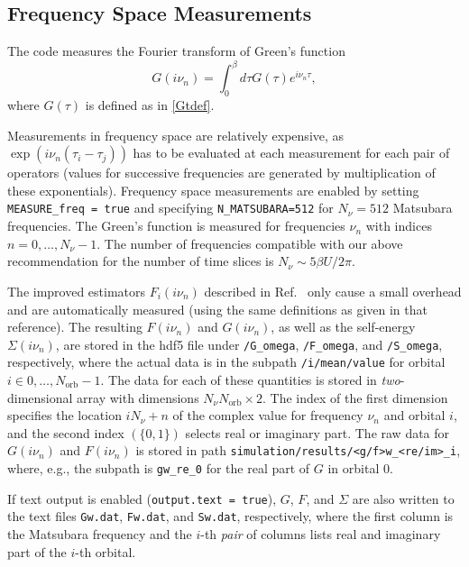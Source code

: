 \documentclass[aps,prb,floatfix,superscriptaddress,twocolumn,notitlepage]{revtex4-1}
\newcommand{\iom}{{\ensuremath{i\nu}}}
\begin{document}
\subsection{Frequency Space Measurements}

The code measures the Fourier transform of Green's function 
\begin{equation}
G(\iom_{n}) = \int_{0}^{\beta} d\tau G(\tau) e^{\iom_{n}\tau},
\end{equation}
where $G(\tau)$ is defined as in \eqref{Gtdef}.

Measurements in frequency space are relatively expensive, as $\exp(\iom_{n} (\tau_i-\tau_j))$ has to be evaluated at each measurement for each pair of operators (values for successive frequencies are generated by multiplication of these exponentials). Frequency space measurements are enabled by setting \verb#MEASURE_freq = true# and specifying \verb#N_MATSUBARA=512# for $N_{\nu}=512$ Matsubara frequencies. The Green's function is measured for frequencies $\nu_{n}$ with indices $n=0,\ldots,N_{\nu}-1$. The number of frequencies compatible with our above recommendation for the number of time slices is $N_{\nu}\sim 5\beta U/2\pi$.

The improved estimators $F_{i}(\iom_n)$ described in Ref.~ only cause a small overhead and are automatically measured (using the same definitions as given in that reference). The resulting $F(\iom_n)$ and $G(\iom_n)$, as well as the self-energy $\Sigma(\iom_n)$, are stored in the hdf5 file under \verb#/G_omega#, \verb#/F_omega#, and \verb#/S_omega#, respectively, where the actual data is in the subpath \verb#/i/mean/value# for orbital $i \in 0,\ldots,N_{\text{orb}}-1$. The data for each of these quantities is stored in \emph{two}-dimensional array with dimensions $N_{\nu}N_{\text{orb}}\times 2$. The index of the first dimension specifies the location $i N_{\nu}+n$ of the complex value for frequency $\nu_{n}$ and orbital $i$, and the second index $(\{0,1\})$ selects real or imaginary part.
The raw data for $G(\iom_{n})$ and $F(\iom_{n})$ is stored in path \verb#simulation/results/<g/f>w_<re/im>_i#, where, e.g., the subpath is \verb#gw_re_0# for the real part of $G$ in orbital $0$.

If text output is enabled (\verb#output.text = true#), $G$, $F$, and $\Sigma$ are also written to the text files \verb#Gw.dat#, \verb#Fw.dat#, and \verb#Sw.dat#, respectively, where the first column is the Matsubara frequency and the $i$-th \emph{pair} of columns lists real and imaginary part of the $i$-th orbital.
\end{document}
